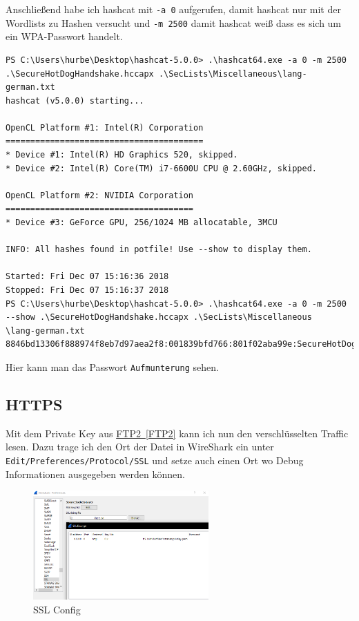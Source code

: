 \documentclass[12pt,a4paper,titlepage,oneside]{scrartcl}
\newcommand{\lang}{de}
\begin{document}
Anschließend habe ich hashcat mit \lstinline{-a 0} aufgerufen, damit hashcat nur mit der Wordlists zu Hashen versucht und \lstinline{-m 2500} damit hashcat weiß dass es sich um ein WPA-Passwort handelt.

\begin{lstlisting}
PS C:\Users\hurbe\Desktop\hashcat-5.0.0> .\hashcat64.exe -a 0 -m 2500 .\SecureHotDogHandshake.hccapx .\SecLists\Miscellaneous\lang-german.txt
hashcat (v5.0.0) starting...

OpenCL Platform #1: Intel(R) Corporation
========================================
* Device #1: Intel(R) HD Graphics 520, skipped.
* Device #2: Intel(R) Core(TM) i7-6600U CPU @ 2.60GHz, skipped.

OpenCL Platform #2: NVIDIA Corporation
======================================
* Device #3: GeForce GPU, 256/1024 MB allocatable, 3MCU

INFO: All hashes found in potfile! Use --show to display them.

Started: Fri Dec 07 15:16:36 2018
Stopped: Fri Dec 07 15:16:37 2018
PS C:\Users\hurbe\Desktop\hashcat-5.0.0> .\hashcat64.exe -a 0 -m 2500 --show .\SecureHotDogHandshake.hccapx .\SecLists\Miscellaneous
\lang-german.txt
8846bd13306f888974f8eb7d97aea2f8:001839bfd766:801f02aba99e:SecureHotDog:Aufmunterung
\end{lstlisting}

Hier kann man das Passwort \lstinline{Aufmunterung} sehen.

\subsection{HTTPS}

Mit dem Private Key aus \hyperref[FTP2]{FTP2~\ref*{FTP2}} kann ich nun den verschlüsselten Traffic lesen. Dazu trage ich den Ort der Datei in WireShark ein unter \lstinline{Edit/Preferences/Protocol/SSL} und setze auch einen Ort wo Debug Informationen ausgegeben werden können.

\begin{figure}[h!]
  \centering
    \includegraphics[width=0.6\textwidth]{./imgs/intranet_screenshots/sslConfig.png}
  \caption{SSL Config}
  \label{fig:sslConfig}
\end{figure}
\end{document}
